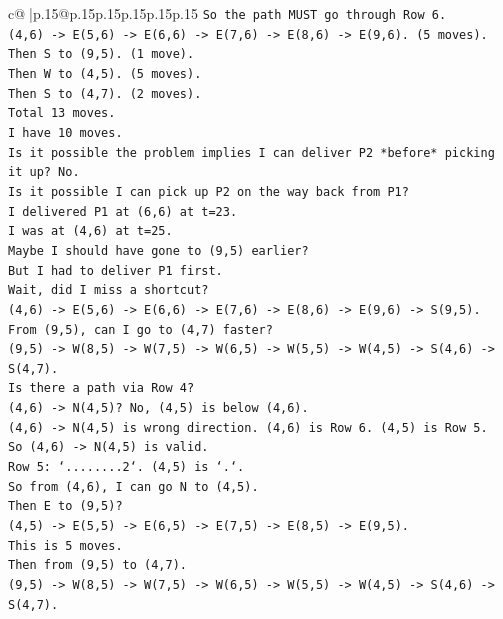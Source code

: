 \documentclass{article}
\begin{document}
{\begin{supertabular}{c@{$\;$}|p{.15\linewidth}@{}p{.15\linewidth}p{.15\linewidth}p{.15\linewidth}p{.15\linewidth}p{.15\linewidth}}
{{{\texttt{So the path MUST go through Row 6.} \\
\texttt{(4,6) {-}> E(5,6) {-}> E(6,6) {-}> E(7,6) {-}> E(8,6) {-}> E(9,6). (5 moves).} \\
\texttt{Then S to (9,5). (1 move).} \\
\texttt{Then W to (4,5). (5 moves).} \\
\texttt{Then S to (4,7). (2 moves).} \\
\texttt{Total 13 moves.} \\
\texttt{I have 10 moves.} \\
\texttt{Is it possible the problem implies I can deliver P2 *before* picking it up? No.} \\
\texttt{Is it possible I can pick up P2 on the way back from P1?} \\
\texttt{I delivered P1 at (6,6) at t=23.} \\
\texttt{I was at (4,6) at t=25.} \\
\texttt{Maybe I should have gone to (9,5) earlier?} \\
\texttt{But I had to deliver P1 first.} \\
\texttt{Wait, did I miss a shortcut?} \\
\texttt{(4,6) {-}> E(5,6) {-}> E(6,6) {-}> E(7,6) {-}> E(8,6) {-}> E(9,6) {-}> S(9,5).} \\
\texttt{From (9,5), can I go to (4,7) faster?} \\
\texttt{(9,5) {-}> W(8,5) {-}> W(7,5) {-}> W(6,5) {-}> W(5,5) {-}> W(4,5) {-}> S(4,6) {-}> S(4,7).} \\
\texttt{Is there a path via Row 4?} \\
\texttt{(4,6) {-}> N(4,5)? No, (4,5) is below (4,6).} \\
\texttt{(4,6) {-}> N(4,5) is wrong direction. (4,6) is Row 6. (4,5) is Row 5.} \\
\texttt{So (4,6) {-}> N(4,5) is valid.} \\
\texttt{Row 5: `........2`. (4,5) is `.`.} \\
\texttt{So from (4,6), I can go N to (4,5).} \\
\texttt{Then E to (9,5)?} \\
\texttt{(4,5) {-}> E(5,5) {-}> E(6,5) {-}> E(7,5) {-}> E(8,5) {-}> E(9,5).} \\
\texttt{This is 5 moves.} \\
\texttt{Then from (9,5) to (4,7).} \\
\texttt{(9,5) {-}> W(8,5) {-}> W(7,5) {-}> W(6,5) {-}> W(5,5) {-}> W(4,5) {-}> S(4,6) {-}> S(4,7).} \\
}}}
\end{supertabular}}
\end{document}

